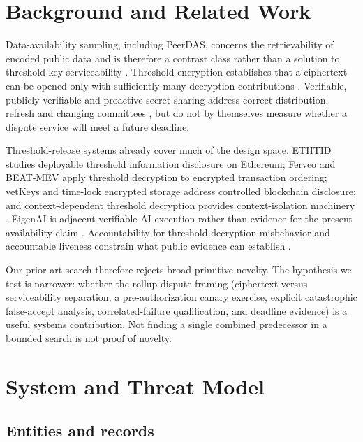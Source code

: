 \documentclass[10pt]{article}
\begin{document}
\section{Background and Related Work}

Data-availability sampling, including PeerDAS, concerns the retrievability of encoded public data and is therefore a contrast class rather than a solution to threshold-key serviceability \citep{eip7594}. Threshold encryption establishes that a ciphertext can be opened only with sufficiently many decryption contributions \citep{boneh2006threshold}. Verifiable, publicly verifiable and proactive secret sharing address correct distribution, refresh and changing committees \citep{feldman1987vss,schoenmakers1999pvss,herzberg1995proactive,yurek2023dpss}, but do not by themselves measure whether a dispute service will meet a future deadline.

Threshold-release systems already cover much of the design space. ETHTID studies deployable threshold information disclosure on Ethereum; Ferveo and BEAT-MEV apply threshold decryption to encrypted transaction ordering; vetKeys and time-lock encrypted storage address controlled blockchain disclosure; and context-dependent threshold decryption provides context-isolation machinery \citep{stengele2021ethtid,bebel2022ferveo,bormet2025epochless,cerulli2023vetkeys,agarwal2025ttles,boneh2025context}. EigenAI is adjacent verifiable AI execution rather than evidence for the present availability claim \citep{eigenai2026}. Accountability for threshold-decryption misbehavior and accountable liveness constrain what public evidence can establish \citep{boneh2023accountability,lewis2025accountable}.

Our prior-art search therefore rejects broad primitive novelty. The hypothesis we test is narrower: whether the rollup-dispute framing (ciphertext versus serviceability separation, a pre-authorization canary exercise, explicit catastrophic false-accept analysis, correlated-failure qualification, and deadline evidence) is a useful systems contribution. Not finding a single combined predecessor in a bounded search is not proof of novelty.

\section{System and Threat Model}\label{sec:model}

\subsection{Entities and records}
\end{document}
